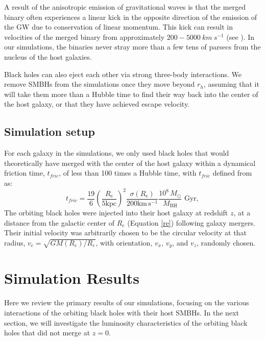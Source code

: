 \documentclass[fleqn,usenatbib,useAMS]{mnras}
\begin{document}
A result of the anisotropic emission of gravitational waves is that the merged binary often experiences a linear kick in the opposite direction of the emission of the GW due to conservation of linear momentum. This kick can result in velocities of the merged binary from approximately $200-5000\ km\ s^{-1}$ (see \citealt{2007PhRvL..98w1101G, 2007PhRvL..98i1101G, 2007PhRvL..98w1102C, 2011PhRvL.107w1102L}).  In our simulations, the binaries never stray more than a few tens of parsecs from the nucleus of the host galaxies.

Black holes can also eject each other via strong three-body interactions. We remove SMBHs from the simulations once they move beyond $r_h$, assuming that it will take them more than a Hubble time to find their way back into the center of the host galaxy, or that they have achieved escape velocity.

\subsection{Simulation setup}\label{subsec:simset}
For each galaxy in the simulations, we only used black holes that would theoretically have merged with the center of the host galaxy within a dynamical friction time, $t_{fric}$, of less than 100 times a Hubble time, with $t_{fric}$ defined from \citet{2008gady.book.....B} as:
\begin{equation}\label{tfric}
    t_{fric} = \frac{19}{6}\left(\frac{R_\mathrm{e}}{5\mathrm{kpc}}\right)^2\frac{\sigma(R_\mathrm{e})}{200\mathrm{km}\,\mathrm{s}^{-1}}\frac{10^8\,M_{\odot}}{M_\mathrm{BH}} \text{  Gyr},
\end{equation}
The orbiting black holes were injected into their host galaxy at redshift $z$, at a distance from the galactic center of $R_{e}$ (Equation \ref{re}) following galaxy mergers.  Their initial velocity was arbitrarily chosen to be the circular velocity at that radius, $v_c = \sqrt{GM(R_e)/R_e}$, with orientation, $v_x$, $v_y$, and $v_z$, randomly chosen.

\section{Simulation Results}\label{sec:results}\label{sec:results_overview}
Here we review the primary results of our simulations, focusing on the various interactions of the orbiting black holes with their host SMBHs. In the next section, we will investigate the luminosity characteristics of the orbiting black holes that did not merge at $z=0$.
\end{document}
